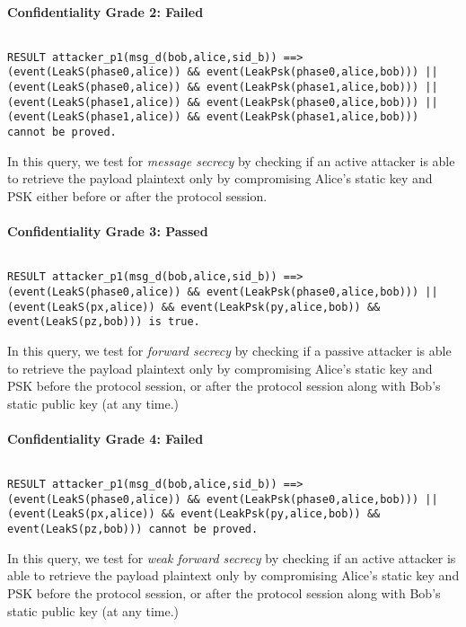 \paragraph{Confidentiality Grade 2: Failed}$ $
\begin{lstlisting}
RESULT attacker_p1(msg_d(bob,alice,sid_b)) ==> (event(LeakS(phase0,alice)) && event(LeakPsk(phase0,alice,bob))) || (event(LeakS(phase0,alice)) && event(LeakPsk(phase1,alice,bob))) || (event(LeakS(phase1,alice)) && event(LeakPsk(phase0,alice,bob))) || (event(LeakS(phase1,alice)) && event(LeakPsk(phase1,alice,bob))) cannot be proved.
\end{lstlisting}

In this query, we test for \emph{message secrecy} by checking if an active attacker is able to retrieve the payload plaintext only by compromising Alice's static key and PSK either before or after the protocol session.


\paragraph{Confidentiality Grade 3: Passed}$ $
\begin{lstlisting}
RESULT attacker_p1(msg_d(bob,alice,sid_b)) ==> (event(LeakS(phase0,alice)) && event(LeakPsk(phase0,alice,bob))) || (event(LeakS(px,alice)) && event(LeakPsk(py,alice,bob)) && event(LeakS(pz,bob))) is true.
\end{lstlisting}

In this query, we test for \emph{forward secrecy} by checking if a passive attacker is able to retrieve the payload plaintext only by compromising Alice's static key and PSK before the protocol session, or after the protocol session along with Bob's static public key (at any time.)


\paragraph{Confidentiality Grade 4: Failed}$ $
\begin{lstlisting}
RESULT attacker_p1(msg_d(bob,alice,sid_b)) ==> (event(LeakS(phase0,alice)) && event(LeakPsk(phase0,alice,bob))) || (event(LeakS(px,alice)) && event(LeakPsk(py,alice,bob)) && event(LeakS(pz,bob))) cannot be proved.
\end{lstlisting}

In this query, we test for \emph{weak forward secrecy} by checking if an active attacker is able to retrieve the payload plaintext only by compromising Alice's static key and PSK before the protocol session, or after the protocol session along with Bob's static public key (at any time.)


